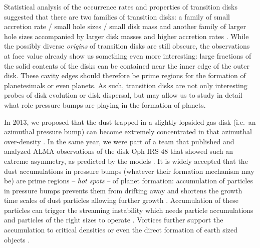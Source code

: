 \documentclass[10pt,fleqn,twoside]{article}
\begin{document}
\begin{figure}
\begin{minipage}[b]{.47\textwidth}
  \label{fig:casassus}
\end{minipage}
\end{figure}

Statistical analysis of the occurrence rates and properties of
transition disks suggested that there are two families of transition
disks: a family of small accretion rate / small hole sizes / small
disk mass and another family of larger hole sizes accompanied by
larger disk masses and higher accretion rates
\citep{2012MNRAS.426L..96O}. While the possibly diverse
\textit{origins} of transition disks are still obscure, the
observations at face value already show us something even more
interesting: large fractions of the solid contents of the disks can be
contained near the inner edge of the outer disk.
These cavity edges should therefore be prime regions for the formation
of planetesimals or even planets. As such, transition disks are not
only interesting probes of disk evolution or disk dispersal, but may
allow us to study in detail what role pressure bumps are playing in
the formation of planets.

In 2013, we proposed  that the dust trapped in a slightly lopsided gas
disk (i.e.\ an azimuthal pressure bump) can become extremely
concentrated in that azimuthal over-density
\citep[see][]{2013A&A...550L...8B}. In the same year, we were part of
a team that published and analyzed ALMA observations of the disk Oph
IRS 48 that showed such an extreme asymmetry, as predicted by the
models \citep[see][]{2013Sci...340.1199V}. It is widely accepted that
the dust accumulations in pressure bumps (whatever their formation
mechanism may be) are prime regions -- \textit{hot spots} -- of planet
formation: accumulation of particles in pressure bumps
\citep[e.g.,][]{2007ApJ...664L..55K} prevents them from drifting away
and shortens the growth time scales of dust particles allowing further
growth \citep{2008A&A...487L...1B}. Accumulation of these particles
can trigger the streaming instability which needs particle
accumulations and particles of the right sizes to operate
\citep{2005ApJ...620..459Y,2007Natur.448.1022J}.
Vortices further support the accumulation to critical densities
\citep{1995A&A...295L...1B,1997Icar..128..213K,2015ApJ...804...35R} or
even the direct formation of earth sized objects
\citep{2009A&A...493.1125L}.
\end{document}
